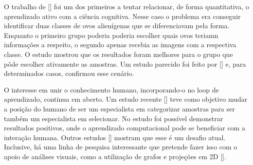 O trabalho de [\cite{castro2009human}] foi um dos primeiros a tentar relacionar, de forma quantitativa, o aprendizado ativo com a ciência cognitiva. Nesse caso o problema era conseguir identificar duas classes de ovos alienígenas que se diferenciavam pela forma. Enquanto o primeiro grupo poderia poderia escolher quais ovos teriamn  informações a respeito, o segundo apenas recebia as imagens com a respectiva classe. O estudo mostrou que os resultados foram melhores para o grupo que pôde escolher ativamente as amostras. Um estudo parecido foi feito por [\cite{markant2014better}] e, para determinados casos, confirmou esse cenário. 

O interesse em unir o conhecimento humano, incorporando-o no loop de aprendizado, continua em aberto. Um estudo recente [\cite{kottke2018other}] teve como objetivo mudar a posição do humano de ser um especialista em categorizar amostras para ser também um especialista em selecionar. No estudo foi possível demonstrar resultados positivos, onde o aprendizado computacional pode se beneficiar com a interação humana. Outros estudos [\cite{calma2016active}] mostram que esse é um desafio atual. Inclusive, há uma linha de pesquisa interessante que pretende fazer isso com o apoio de análises visuais, como a utilização de grafos e projeções em 2D [\cite{yang2018visually, bernard2018comparing, weigl2016mapview}].


